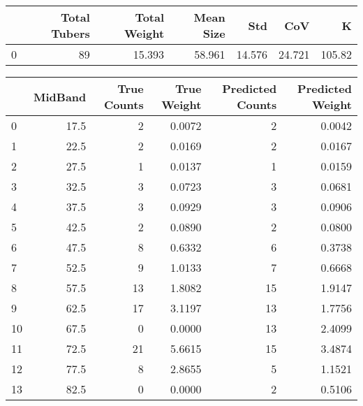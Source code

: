 \begin{tabular}{lrrrrrr}
\toprule
{} &  Total Tubers &  Total Weight &  Mean Size &     Std &     CoV &       K \\
\midrule
0 &            89 &        15.393 &     58.961 &  14.576 &  24.721 &  105.82 \\
\bottomrule
\end{tabular}

\begin{tabular}{lrrrrr}
\toprule
{} &  MidBand &  True Counts &  True Weight &  Predicted Counts &  Predicted Weight \\
\midrule
0  &     17.5 &            2 &       0.0072 &                 2 &            0.0042 \\
1  &     22.5 &            2 &       0.0169 &                 2 &            0.0167 \\
2  &     27.5 &            1 &       0.0137 &                 1 &            0.0159 \\
3  &     32.5 &            3 &       0.0723 &                 3 &            0.0681 \\
4  &     37.5 &            3 &       0.0929 &                 3 &            0.0906 \\
5  &     42.5 &            2 &       0.0890 &                 2 &            0.0800 \\
6  &     47.5 &            8 &       0.6332 &                 6 &            0.3738 \\
7  &     52.5 &            9 &       1.0133 &                 7 &            0.6668 \\
8  &     57.5 &           13 &       1.8082 &                15 &            1.9147 \\
9  &     62.5 &           17 &       3.1197 &                13 &            1.7756 \\
10 &     67.5 &            0 &       0.0000 &                13 &            2.4099 \\
11 &     72.5 &           21 &       5.6615 &                15 &            3.4874 \\
12 &     77.5 &            8 &       2.8655 &                 5 &            1.1521 \\
13 &     82.5 &            0 &       0.0000 &                 2 &            0.5106 \\
\bottomrule
\end{tabular}

